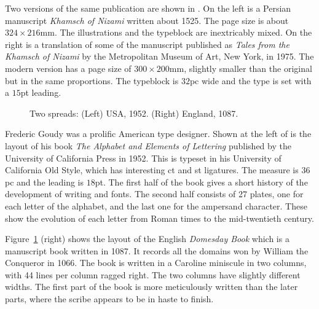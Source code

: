 \documentclass[10pt,letterpaper]{memoir}
\newlength{\pwlayi}\setlength{\pwlayi}{0.45\textwidth} %
\newlength{\pwlayii}\setlength{\pwlayii}{0.45\pwlayi}
\begin{document}
     Two versions of the same publication are shown in .
On the left is a Persian manuscript \textit{Khamsch of Nizami} written
about 1525. The page size is about $324 \times 216$mm. The 
illustrations and
the typeblock are inextricably mixed. On the right is a translation of
some of the manuscript published as \textit{Tales from the Khamsch of Nizami}
by the Metropolitan Museum of Art, New York, in 1975. The modern version
has a page size of $300 \times 200$mm, slightly smaller than the original
but in the same proportions. The typeblock is $32$pc wide and the type is
set with a $15$pt leading.

\begin{figure}
\centering
\begin{minipage}[b]{\pwlayi}
\end{minipage}
\hfill
\begin{minipage}[b]{\pwlayi}
\end{minipage}
\caption[Two spreads: USA, 1952 and England, 1087]%
        {Two spreads: (Left) USA, 1952.
         (Right) England, 1087.} \label{fb:11}
\end{figure}

    Frederic Goudy was a prolific American type designer. Shown at the left of
 is the layout of his book \textit{The Alphabet and Elements
of Lettering} published by the University of California Press in 1952.
This is typeset in his University of California Old Style, which has
interesting ct and st ligatures. The measure is $36$pc and the leading
is $18$pt. The first half of the book gives a short history of the development
of writing and fonts. The second half consists of 27 plates, one for each 
letter of the alphabet, and the last one for the ampersand character. These 
show the evolution of each letter from Roman times to the mid-twentieth
century.


    Figure~\ref{fb:11} (right) shows the layout of the English 
\textit{Domesday Book} which is a manuscript book written in 1087. 
It records all the
domains won by William the Conqueror in 1066. The book is written
in a Caroline miniscule
in two columns, with 44 lines per column ragged right. The two columns
have slightly different widths. The first part of the book is more meticulously
written than the later parts, where the scribe appears to be in haste to
finish.
\end{document}
